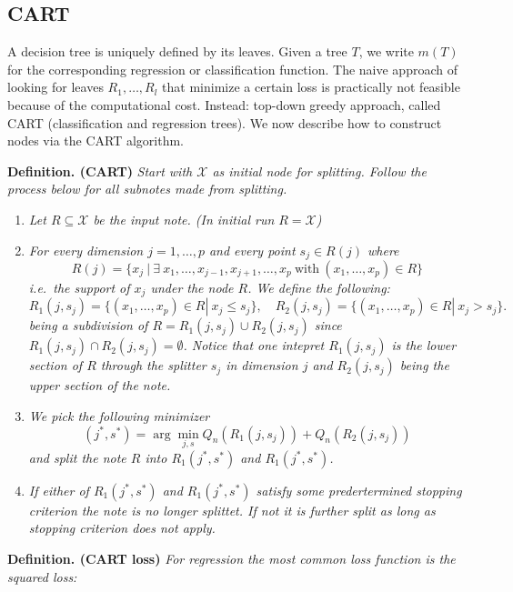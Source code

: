 \documentclass[a4paper,12pt,openany]{book}
\providecommand{\tightlist}{%
 \setlength{\itemsep}{0pt}\setlength{\parskip}{0pt}}
\begin{document}
\hypertarget{cart}{%
\subsection{CART}\label{cart}}

A decision tree is uniquely defined by its leaves. Given a tree \(T\), we write \(m(T)\) for the corresponding regression or classification function. The naive approach of looking for leaves \(R_1,\dots, R_l\) that minimize a certain loss is practically not feasible because of the computational cost. Instead: top-down greedy approach, called CART (classification and regression trees). We now describe how to construct nodes via the CART algorithm.

\textbf{Definition. (CART)} \emph{Start with \(\mathcal X\) as initial node for splitting. Follow the process below for all subnotes made from splitting.}

\begin{enumerate}
\def\labelenumi{\arabic{enumi})}
\tightlist
\item
  \emph{Let \(R\subseteq \mathcal X\) be the input note. (In initial run \(R=\mathcal X\))}
\item
  \emph{For every dimension \(j=1,\dots,p\) and every point \(s_j\in R(j)\) where}
  \[R(j)= \{x_j\ |\     \exists\ x_1,\dots,x_{j-1},x_{j+1},\dots,x_p\ \text{with}\ (x_1,\dots,x_p)\in R\}\]
  \emph{i.e.~the support of \(x_j\) under the node \(R\). We define the following:}
  \[R_1(j,s_j)=\{(x_1,\dots,x_p)\in R| \ x_j \leq s_j\}, \quad R_2(j,s_j)=\{(x_1,\dots,x_p)\in R| \ x_j > s_j\}.\]
  \emph{being a subdivision of \(R=R_1(j,s_j)\cup R_2(j,s_j)\) since \(R_1(j,s_j)\cap R_2(j,s_j)=\emptyset\). Notice that one intepret \(R_1(j,s_j)\) is the lower section of \(R\) through the splitter \(s_j\) in dimension \(j\) and \(R_2(j,s_j)\) being the upper section of the note.}
\item
  \emph{We pick the following minimizer}
  \[(j^\ast,s^\ast)= \arg\min_{j,s} Q_n(R_1(j,s_j)) + Q_n(R_2(j,s_j))\]
  \emph{and split the note \(R\) into \(R_1(j^*,s^*)\) and \(R_1(j^*,s^*)\).}
\item
  \emph{If either of \(R_1(j^*,s^*)\) and \(R_1(j^*,s^*)\) satisfy some predertermined stopping criterion the note is no longer splittet. If not it is further split as long as stopping criterion does not apply.}
\end{enumerate}

\textbf{Definition. (CART loss)} \emph{For regression the most common loss function is the squared loss:}
\end{document}
